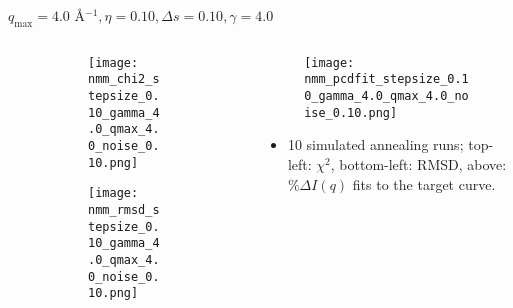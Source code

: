 \documentclass{beamer}
\begin{document}
\begin{frame}{$ q_{\textrm{max}}=4.0 $ \AA $^{-1}, \eta=0.10, \Delta s=0.10, \gamma=4.0$}
	\begin{columns}
		\begin{column}{.5\textwidth}
			\begin{figure}[H]
			\centering
			\begin{subfigure}[b]{\textwidth}
				\centering
				\texttt{[image: nmm\_chi2\_stepsize\_0.10\_gamma\_4.0\_qmax\_4.0\_noise\_0.10.png]}
				\label{fig:}
			\end{subfigure}
			\begin{subfigure}[b]{\textwidth}
				\centering
				\texttt{[image: nmm\_rmsd\_stepsize\_0.10\_gamma\_4.0\_qmax\_4.0\_noise\_0.10.png]}
				\label{fig:}
			\end{subfigure}
			\end{figure}
		\end{column}
		\begin{column}{.5\textwidth}
			\begin{figure}[H]
				\centering
				\texttt{[image: nmm\_pcdfit\_stepsize\_0.10\_gamma\_4.0\_qmax\_4.0\_noise\_0.10.png]}
				\label{fig:}
			\end{figure}
			\begin{itemize}
				\item 10 simulated annealing runs; top-left: $\chi^2$, bottom-left: RMSD, above: $\%\Delta I(q)$ fits to the target curve.
			\end{itemize}
		\end{column}
	\end{columns}
\end{frame}
 
\end{document}
